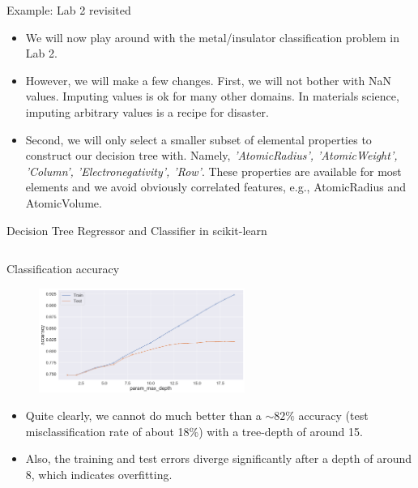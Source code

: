\documentclass[aspectratio=169]{beamer}
\begin{document}
\begin{frame}{Example: Lab 2 revisited}
    \begin{itemize}
        \item We will now play around with the metal/insulator classification problem in Lab 2.
        \item However, we will make a few changes. First, we will not bother with NaN values. Imputing values is ok for many other domains. In materials science, imputing arbitrary values is a recipe for disaster.
        \item Second, we will only select a smaller subset of elemental properties to construct our decision tree with. Namely, \textit{'AtomicRadius', 'AtomicWeight', 'Column', 'Electronegativity', 'Row'}. These properties are available for most elements and we avoid obviously correlated features, e.g., AtomicRadius and AtomicVolume.
    \end{itemize}
\end{frame}


\begin{frame}[fragile]{Decision Tree Regressor and Classifier in scikit-learn}
\inputminted{python}{example_sklearn_decision_tree.py}
\end{frame}


\begin{frame}{Classification accuracy}
    \begin{figure}
        \centering
        \includegraphics[width=0.6\textwidth]{figures/accuracy_metal_insulator.png}
    \end{figure}
    \begin{itemize}
        \item Quite clearly, we cannot do much better than a $\sim 82\%$ accuracy (test misclassification rate of about 18\%) with a tree-depth of around 15.
        \item Also, the training and test errors diverge significantly after a depth of around 8, which indicates overfitting.
    \end{itemize}
\end{frame}
\end{document}
